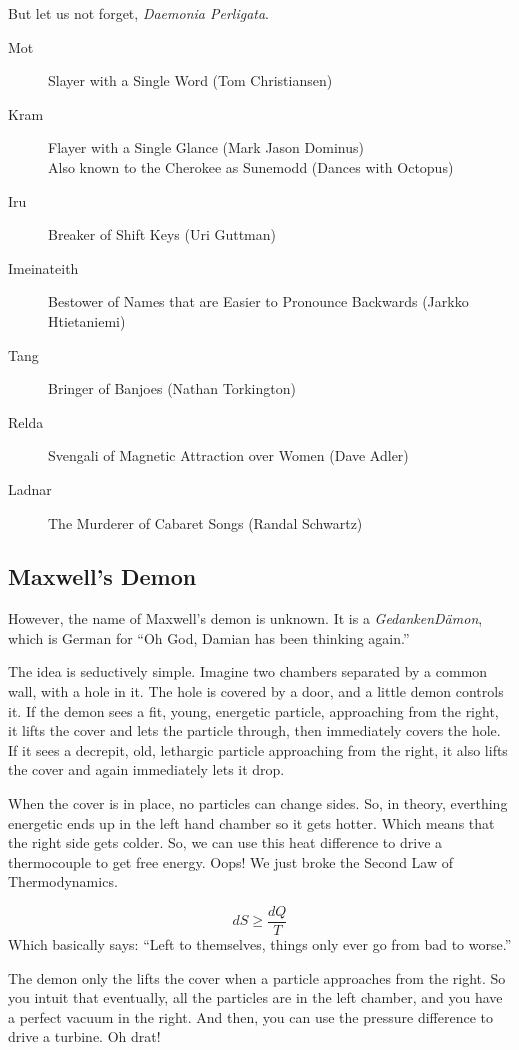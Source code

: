\documentclass{article}
\begin{document}
But let us not forget, \textit{Daemonia Perligata}.

\begin{description}
\item[Mot] Slayer with a Single Word (Tom Christiansen)
\item[Kram] Flayer with a Single Glance (Mark Jason Dominus)\\
Also known to the Cherokee as Sunemodd (Dances with Octopus)
\item[Iru] Breaker of Shift Keys (Uri Guttman)
\item[Imeinateith] Bestower of Names that are Easier to Pronounce Backwards
(Jarkko Htietaniemi)
\item[Tang] Bringer of Banjoes (Nathan Torkington)
\item[Relda] Svengali of Magnetic Attraction over Women (Dave Adler)
\item[Ladnar] The Murderer of Cabaret Songs (Randal Schwartz)
\end{description}

\subsection{Maxwell's Demon}
However, the name of Maxwell's demon is unknown.  It is a
\textit{GedankenD\"amon}, which is German for ``Oh God,
Damian has been thinking again.''

The idea is seductively simple.  Imagine two chambers separated by a 
common wall, with a hole in it.  The hole is covered by a door, and
a little demon controls it.  If the demon
sees a fit, young, energetic particle, approaching from the right,
it lifts the cover and lets the particle through, 
then immediately covers the hole.  If it
sees a decrepit, old, lethargic particle approaching from the right, it
also lifts the cover and again immediately lets it drop.

When the cover is in place, no particles can change sides.  So, in
theory, everthing energetic ends up in the left hand chamber so it 
gets hotter.  Which means that the right side gets colder.  So, we
can use this heat difference to drive a
thermocouple to get free energy.  Oops!  We just broke the Second Law of
Thermodynamics.

\[dS \ge \frac{dQ}{T}\]
Which basically says: ``Left to themselves, things only ever go from 
bad to worse.''

The demon only the lifts the cover when a particle approaches from 
the right.  So you intuit that eventually, all the particles are in the
left chamber, and you have a perfect vacuum in the right.
And then, you can use the pressure difference to drive a turbine.  
Oh drat!  
\end{document}
